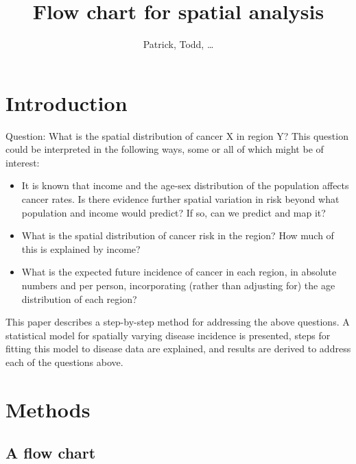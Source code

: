 \documentclass[12pt]{article}
\title{Flow chart for spatial analysis}
\author{Patrick, Todd, \ldots}
\begin{document}
\maketitle
\section{Introduction}

Question: What is the spatial distribution of cancer X in region Y?  This question could be interpreted in the following ways, some or all of which might be of interest:
\begin{itemize}
	\item It is known that income and the age-sex distribution of the population affects cancer rates.  Is there evidence further spatial variation in risk beyond what population and income would predict?  If so, can we predict and map it?
	\item What is the spatial distribution of cancer risk in the region?  How much of this is explained by income?
	\item What is the expected future incidence of cancer in each region, in absolute numbers and per person, incorporating (rather than adjusting for) the age distribution of each region?
\end{itemize}


This paper describes a step-by-step method for addressing the above questions.  A  statistical model for spatially varying disease incidence is presented, steps for fitting this model to disease data are explained, and results are derived to address each of the questions above.  

\section{Methods}

\subsection{A flow chart}
\end{document}
